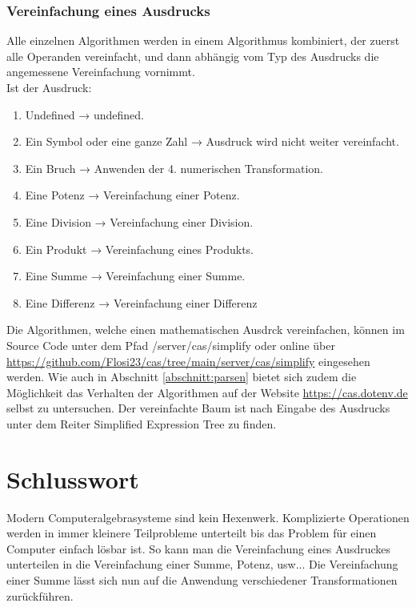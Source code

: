 \documentclass[11pt]{article}
\begin{document}
\subsubsection{Vereinfachung eines Ausdrucks}
Alle einzelnen Algorithmen werden in einem Algorithmus kombiniert, 
der zuerst alle Operanden vereinfacht, und dann abhängig vom Typ des Ausdrucks die angemessene Vereinfachung vornimmt. \\

Ist der Ausdruck:
\begin{enumerate}
  \item Undefined → undefined.
  \item Ein Symbol oder eine ganze Zahl → Ausdruck wird nicht weiter vereinfacht.
  \item Ein Bruch → Anwenden der 4. numerischen Transformation. 
  \item Eine Potenz → Vereinfachung einer Potenz.
  \item Eine Division → Vereinfachung einer Division.
  \item Ein Produkt → Vereinfachung eines Produkts.
  \item Eine Summe → Vereinfachung einer Summe.
  \item Eine Differenz → Vereinfachung einer Differenz
\end{enumerate}

Die Algorithmen, welche einen mathematischen Ausdrck vereinfachen, können im Source Code unter
dem Pfad /server/cas/simplify oder online über \url{https://github.com/Flosi23/cas/tree/main/server/cas/simplify}
eingesehen werden.
Wie auch in Abschnitt \ref{abschnitt:parsen} bietet sich zudem die Möglichkeit das Verhalten der Algorithmen auf der Website 
\url{https://cas.dotenv.de} selbst zu untersuchen. Der vereinfachte Baum ist nach Eingabe des
Ausdrucks unter dem Reiter \glqq Simplified Expression Tree\grqq{} zu finden.

\section{Schlusswort}

Modern Computeralgebrasysteme sind kein Hexenwerk. Komplizierte Operationen 
werden in immer kleinere Teilprobleme unterteilt bis das 
Problem für einen Computer einfach lösbar ist. So kann man die Vereinfachung eines
Ausdruckes unterteilen in die Vereinfachung einer Summe, Potenz, usw... Die Vereinfachung
einer Summe lässt sich nun auf die Anwendung verschiedener Transformationen zurückführen.\\
\end{document}
